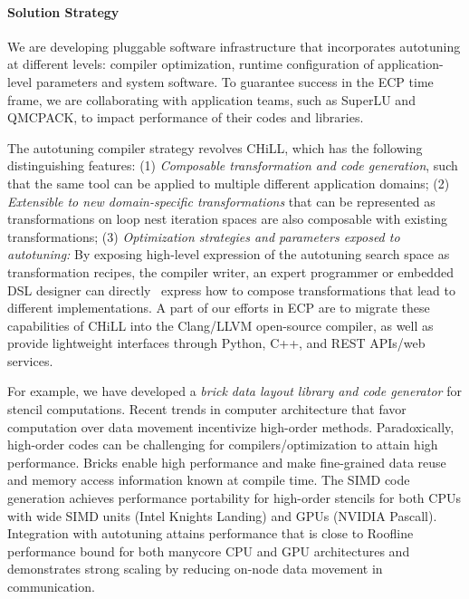\paragraph{Solution Strategy}
We are developing pluggable software infrastructure that incorporates
autotuning at different levels: compiler optimization, runtime configuration of application-level parameters and system software.
To guarantee success in the ECP time frame, we are collaborating with
application teams, such as SuperLU and QMCPACK, to impact performance of their
codes and libraries.

The autotuning compiler strategy revolves CHiLL, which has the following distinguishing features:
(1) \textit{Composable transformation and code generation}, such
that the same tool can be applied
to multiple different application domains;
(2) \textit{Extensible to new domain-specific transformations} that can be represented as transformations on loop nest iteration spaces are also
composable with existing transformations;
(3) \textit{Optimization strategies and parameters exposed to autotuning:}
By exposing high-level expression
of the autotuning search space as transformation recipes, the compiler writer, an expert programmer or embedded DSL designer can directly \
express how to compose
 transformations that lead to different implementations.
A part of our efforts in ECP are to migrate these capabilities of CHiLL
into the Clang/LLVM open-source compiler, as well as provide lightweight
interfaces through Python, C++, and REST APIs/web services.

For example, we have developed a \textit{brick data layout library and code generator} for
stencil computations.
Recent trends in computer architecture that favor computation over data movement incentivize high-order methods.  Paradoxically, high-order codes can be challenging for compilers/optimization to attain high performance.  Bricks enable high performance and make fine-grained data reuse and memory access information known at compile time.  The SIMD code generation achieves performance portability
for high-order stencils for both CPUs with wide SIMD units (Intel Knights
Landing) and GPUs (NVIDIA Pascall).  Integration with autotuning attains
performance that is close to Roofline performance bound for both manycore CPU
and GPU architectures and demonstrates strong scaling by reducing on-node data movement in communication.

